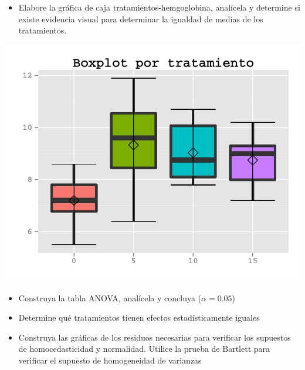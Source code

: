 \documentclass[a4paper]{scrartcl}\usepackage[]{graphicx}\usepackage[]{color}
\makeatletter
\def\maxwidth{ %
  \ifdim\Gin@nat@width>\linewidth
    \linewidth
  \else
    \Gin@nat@width
  \fi
}
\newenvironment{knitrout}{}{} %
\makeatother
\begin{document}
\begin{itemize}
  \item Elabore la gráfica de caja tratamientos-hemgoglobina, analícela y determine si existe evidencia visual para determinar la igualdad de medias de los tratamientos.
\end{itemize}

\begin{knitrout}
\color{fgcolor}

{\centering \includegraphics[width=\maxwidth]{figure/unnamed-chunk-11} 

}



\end{knitrout}

\begin{itemize}
  \item Construya la tabla ANOVA, analícela y concluya ($\alpha = 0.05$)
\end{itemize}

\begin{itemize}
  \item Determine qué tratamientos tienen efectos estadísticamente iguales
\end{itemize}

\begin{itemize}
  \item Construya las gráficas de los residuos necesarias para verificar los supuestos de homocedasticidad y normalidad. Utilice la prueba de Bartlett para verificar el supuesto de homogeneidad de varianzas 
\end{itemize}
\end{document}
